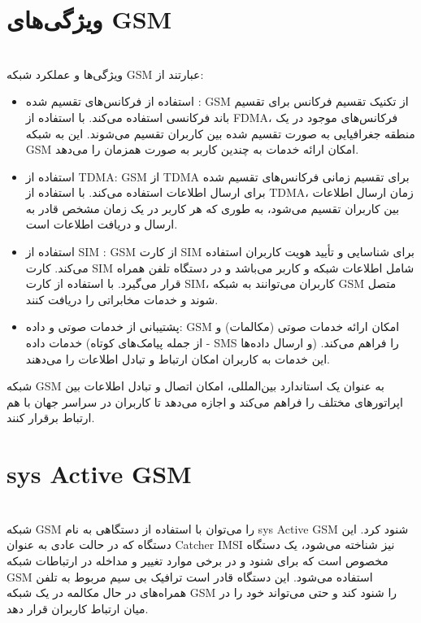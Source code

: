 \documentclass{article}
\begin{document}
\section{ویژگی‌های GSM}
\leavevmode
\\
ویژگی‌ها و عملکرد شبکه GSM عبارتند از:

\begin{itemize}
\item 
استفاده از فرکانس‌های تقسیم شده : GSM از تکنیک تقسیم فرکانس برای تقسیم باند فرکانسی استفاده می‌کند. با استفاده از FDMA، فرکانس‌های موجود در یک منطقه جغرافیایی به صورت تقسیم شده بین کاربران تقسیم می‌شوند. این به شبکه GSM امکان ارائه خدمات به چندین کاربر به صورت همزمان را می‌دهد.

\item
 استفاده از TDMA: GSM از TDMA برای تقسیم زمانی فرکانس‌های تقسیم شده برای ارسال اطلاعات استفاده می‌کند. با استفاده از TDMA، زمان ارسال اطلاعات بین کاربران تقسیم می‌شود، به طوری که هر کاربر در یک زمان مشخص قادر به ارسال و دریافت اطلاعات است.


\item
استفاده از SIM : GSM از کارت SIM برای شناسایی و تأیید هویت کاربران استفاده می‌کند. کارت SIM شامل اطلاعات شبکه و کاربر می‌باشد و در دستگاه تلفن همراه قرار می‌گیرد. با استفاده از کارت SIM، کاربران می‌توانند به شبکه GSM متصل شوند و خدمات مخابراتی را دریافت کنند.


\item 
پشتیبانی از خدمات صوتی و داده: GSM امکان ارائه خدمات صوتی (مکالمات) و خدمات داده (از جمله پیامک‌های کوتاه - SMS و ارسال داده‌ها) را فراهم می‌کند. این خدمات به کاربران امکان ارتباط و تبادل اطلاعات را می‌دهند.

\end{itemize}

شبکه GSM به عنوان یک استاندارد بین‌المللی، امکان اتصال و تبادل اطلاعات بین اپراتورهای مختلف را فراهم می‌کند و اجازه می‌دهد تا کاربران در سراسر جهان با هم ارتباط برقرار کنند.
\\

\section{sys Active GSM}
\leavevmode
\\
 شبکه GSM را می‌توان با استفاده از دستگاهی به نام sys Active GSM شنود کرد. این دستگاه که در حالت عادی به عنوان Catcher IMSI نیز شناخته می‌شود، یک دستگاه مخصوص است که برای شنود و در برخی موارد تغییر و مداخله در ارتباطات شبکه GSM استفاده می‌شود. این دستگاه قادر است ترافیک بی سیم مربوط به تلفن همراه‌های در حال مکالمه در یک شبکه GSM را شنود کند و حتی می‌تواند خود را در 
میان ارتباط کاربران قرار دهد.
\\
\end{document}
